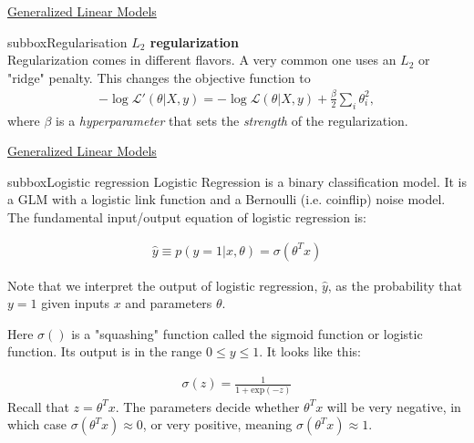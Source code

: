 \begin{textbox}{\href{https://compneuro.neuromatch.io/tutorials/W1D3_GeneralizedLinearModels/student/W1D3_Tutorial2.html}{Generalized Linear Models } }
\begin{subbox}{subbox}{Regularisation 
}
\textbf{$L_2$ regularization}\\
Regularization comes in different flavors. A very common one uses an $L_2$ or "ridge" penalty. This changes the objective function to
\begin{align}
-\log\mathcal{L}'(\theta | X, y)=
-\log\mathcal{L}(\theta | X, y) +\frac\beta2\sum_i\theta_i^2,
\end{align}
where $\beta$ is a \textit{hyperparameter} that sets the \textit{strength} of the regularization.

\end{subbox}

\end{textbox}
\begin{textbox}{\href{https://compneuro.neuromatch.io/tutorials/W1D3_GeneralizedLinearModels/student/W1D3_Tutorial2.html}{Generalized Linear Models } }
\begin{subbox}{subbox}{Logistic regression}
\scriptsize
Logistic Regression is a binary classification model. It is a GLM with a logistic link function and a Bernoulli (i.e. coinflip) noise model.
The fundamental input/output equation of logistic regression is:

\begin{align}
\hat{y} \equiv p(y=1|x,\theta) = \sigma(\theta^Tx)
\end{align}

Note that we interpret the output of logistic regression, $\hat{y}$, as the probability that $y = 1$ given inputs $x$ and parameters $\theta$.

Here $\sigma()$ is a "squashing" function called the sigmoid function or logistic function. Its output is in the range $0 \leq y \leq 1$. It looks like this:

\begin{align}
\sigma(z) = \frac{1}{1 + \textrm{exp}(-z)}
\end{align}
Recall that $z = \theta^T x$. The parameters decide whether $\theta^T x$ will be very negative, in which case $\sigma(\theta^T x)\approx 0$, or very positive, meaning  $\sigma(\theta^T x)\approx 1$.


\end{subbox}
\end{textbox}
